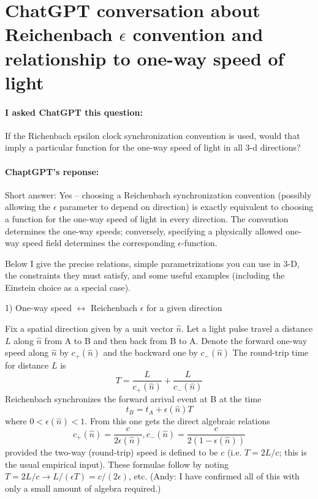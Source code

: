 \documentclass[a4paper]{article}
\theoremstyle{plain}
\theoremstyle{definition}
\newcommand{\hatvec}[1]{\hat{#1}}
\begin{document}
\section{ChatGPT conversation about Reichenbach $\epsilon$ convention and relationship to one-way speed of light}
\label{app:reichenback-epsilon}


\paragraph{I asked ChatGPT this question:}

If the Richenbach epsilon clock synchronization convention is used,
would that imply a particular function for the one-way speed of light
in all 3-d directions?


\paragraph{ChaptGPT's reponse:}

Short answer: Yes -- choosing a Reichenbach synchronization convention
(possibly allowing the $\epsilon$ parameter to depend on direction) is
exactly equivalent to choosing a function for the one-way speed of
light in every direction.  The convention determines the one-way
speeds; conversely, specifying a physically allowed one-way speed
field determines the corresponding $\epsilon$-function.

Below I give the precise relations, simple parametrizations you can
use in 3-D, the constraints they must satisfy, and some useful
examples (including the Einstein choice as a special case).

1) One-way speed $\leftrightarrow$ Reichenbach $\epsilon$ for a given direction

Fix a spatial direction given by a unit vector $\hatvec{n}$.
Let a light pulse travel a distance $L$
along $\hatvec{n}$
from A to B and then back from B to A.
Denote the forward one-way speed along $\hatvec{n}$ by
$c_{+}(\hatvec{n})$
and the backward one by
$c_{-}(\hatvec{n})$
The round-trip time for distance $L$ is
\begin{equation}
T = \frac{L}{c_{+}(\hatvec{n})} + \frac{L}{c_{-}(\hatvec{n})}
\end{equation}
Reichenbach synchronizes the forward arrival event at B at the time
\begin{equation}
t_B = t_A + \epsilon(\hatvec{n}) T
\end{equation}
where $0 < \epsilon(\hatvec{n}) < 1$.
From this one gets the direct algebraic relations
\begin{equation}
c_{+}(\hatvec{n}) = \frac{c}{2 \epsilon(\hatvec{n})}, c_{-}(\hatvec{n}) = \frac{c}{2(1-\epsilon(\hatvec{n}))}
\end{equation}
provided the two-way (round-trip) speed is defined to be $c$
(i.e. $T = 2L/c$; this is the usual empirical input).
These formulae follow by noting $T = 2L/c \rightarrow L/(\epsilon T) =
c/(2 \epsilon)$, etc.  (Andy: I have confirmed all of this with
only a small amount of algebra required.)
\end{document}
